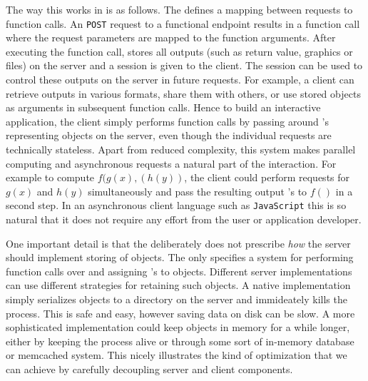 The way this works in \OpenCPU is as follows. The \OpenCPU \API defines a mapping between \HTTP requests to \R function calls. An \HTTP \texttt{POST} request to a functional endpoint results in a function call where the request parameters are mapped to the function arguments. After executing the function call, \OpenCPU stores all outputs (such as return value, graphics or files) on the server and a session \ID is given to the client. The session \ID can be used to control these outputs on the server in future requests. For example, a client can retrieve outputs in various formats, share them with others, or use stored \R objects as arguments in subsequent function calls. Hence to build an interactive application, the client simply performs function calls by passing around \ID's representing objects on the server, even though the individual requests are technically stateless. Apart from reduced complexity, this system makes parallel computing and asynchronous requests a natural part of the interaction. For example to compute $f(g(x),(h(y))$, the client could perform \RPC requests for $g(x)$ and $h(y)$ simultaneously and pass the resulting output \ID's to $f()$ in a second step. In an asynchronous client language such as \texttt{JavaScript} this is so natural that it does not require any effort from the user or application developer.

One important detail is that the \OpenCPU \API deliberately does not prescribe \emph{how} the server should implement storing of objects. The \API only specifies a system for performing \R function calls over \HTTP and assigning \ID's to objects. Different server implementations can use different strategies for retaining such objects. A native implementation simply serializes objects to a directory on the server and immideately kills the process. This is safe and easy, however saving data on disk can be slow. A more sophisticated implementation could keep objects in memory for a while longer, either by keeping the \R process alive or through some sort of in-memory database or memcached system. This nicely illustrates the kind of optimization that we can achieve by carefully decoupling server and client components.